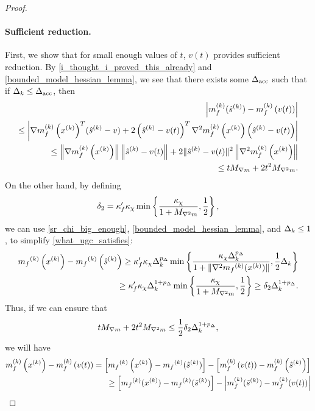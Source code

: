 \begin{proof}
\paragraph*{Sufficient reduction.}
First, we show that for small enough values of $t$, $v(t)$ provides sufficient reduction.
By \cref{i_thought_i_proved_this_already} and \cref{bounded_model_hessian_lemma}, we see that there exists some ${\Delta_{\textrm{acc}}}$ such that if
$\Delta_k \le {\Delta_{\textrm{acc}}}$, then
\begin{align*}
\left|m_f^{(k)}({{\hat s}^{(k)}} ) - m_f^{(k)}\left(v(t)\right)\right| \\
\le \left|{\nabla m_f^{(k)}\left(x^{(k)}\right)}^T({{\hat s}^{(k)}}  - v) 
+ 2 \left({{\hat s}^{(k)}}  - v(t)\right) ^T \nabla^2m_f^{(k)}\left(x^{(k)}\right)\left({{\hat s}^{(k)}}  - v(t)\right) \right| \\
\le \left\|{\nabla m_f^{(k)}\left(x^{(k)}\right)}\right \|  \left\|{{\hat s}^{(k)}} - v(t)\right\| + 2  \|{{\hat s}^{(k)}}  - v(t)\|^2 \left\|\nabla^2m_f^{(k)}\left(x^{(k)}\right)\right\| \\
\le t {M_{\nabla m}} + 2t^2{M_{\nabla^2 m}}. 
\end{align*}
On the other hand, by defining
\begin{align}
\delta_2 = \kappa_f' \kappa_{\chi} \min\left\{ \frac{\kappa_{\chi}}{1 + {M_{\nabla^2 m}}}, \frac 1 2 \right\}, \label{define_delta2}
\end{align}
we can use \cref{sr_chi_big_enough}, \cref{bounded_model_hessian_lemma}, and $\Delta_k \le 1$, to simplify \cref{what_ugc_satisfies}:
\begin{align*}
{{m}_f}^{(k)}\left(x^{(k)}\right) - {{m}_f}^{(k)}\left({{\hat s}^{(k)}} \right)
\ge \kappa_f' \kappa_{\chi} \Delta_k^{p_{\Delta}} \min\left\{ \frac{\kappa_{\chi} \Delta_k^{p_{\Delta}}}{1+\|\nabla^2 {{m}_f}^{(k)}(x^{(k)})\|}, \frac 1 2 \Delta_k \right\} \\
\ge \kappa_f' \kappa_{\chi} \Delta_k^{1 + p_{\Delta}} \min\left\{ \frac{\kappa_{\chi}}{1 + {M_{\nabla^2 m}}}, \frac 1 2  \right\}
\ge \delta_2 \Delta_k^{1 + p_{\Delta}}.
\end{align*}
Thus, if we can ensure that
\begin{align}
t {M_{\nabla m}} + 2t^2{M_{\nabla^2 m}} \le \frac 1 2 \delta_2 \Delta_k^{1 + p_{\Delta}}, \label{ensure_this}
\end{align}
we will have
\begin{align*}
m_f^{(k)}\left(\xk\right) - m_f^{(k)}\left(v(t)\right) = \left[\mfk\left(\xk\right) - \mfk(\slin )\right] - \left[m_f^{(k)}\left(v(t)\right) - m_f^{(k)}\left(\slin \right)\right] \nonumber \\
 \ge \left[\mfk(\xk) - \mfk(\slin )\right] - \left|m_f^{(k)}(\slin ) - m_f^{(k)}(v(t)) \right| \nonumber \\

\end{align*}
\end{proof}
